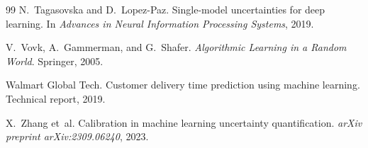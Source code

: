 \documentclass[10pt,twocolumn]{article}
\begin{document}
\begin{thebibliography}{99}
N.~Tagasovska and D.~Lopez-Paz.
\newblock Single-model uncertainties for deep learning.
\newblock In \emph{Advances in Neural Information Processing Systems}, 2019.

V.~Vovk, A.~Gammerman, and G.~Shafer.
\newblock \emph{Algorithmic Learning in a Random World}.
\newblock Springer, 2005.

Walmart Global Tech.
\newblock Customer delivery time prediction using machine learning.
\newblock Technical report, 2019.

X.~Zhang et~al.
\newblock Calibration in machine learning uncertainty quantification.
\newblock \emph{arXiv preprint arXiv:2309.06240}, 2023.

\end{thebibliography}
\end{document}
